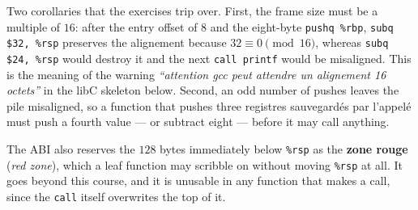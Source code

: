 \begin{figure}[h!]
  \centering
\end{figure}

\begin{remark}
  Two corollaries that the exercises trip over. First, the frame size must be a
  multiple of $16$: after the entry offset of $8$ and the eight-byte
  \texttt{pushq \%rbp}, \texttt{subq \$32, \%rsp} preserves the alignement
  because $32 \equiv 0 \pmod{16}$, whereas \texttt{subq \$24, \%rsp} would
  destroy it and the next \texttt{call printf} would be misaligned. This is the
  meaning of the warning \textit{``attention gcc peut attendre un alignement 16
  octets''} in the libC skeleton below. Second, an odd number of pushes leaves
  the pile misaligned, so a function that pushes three registres sauvegardés par
  l'appelé must push a fourth value --- or subtract eight --- before it may call
  anything.
\end{remark}

\begin{remark}
  The ABI also reserves the $128$ bytes immediately below \texttt{\%rsp} as the
  \textbf{zone rouge} (\textit{red zone}), which a leaf function may scribble on
  without moving \texttt{\%rsp} at all. It goes beyond this course, and it is
  unusable in any function that makes a call, since the \texttt{call} itself
  overwrites the top of it.
\end{remark}

